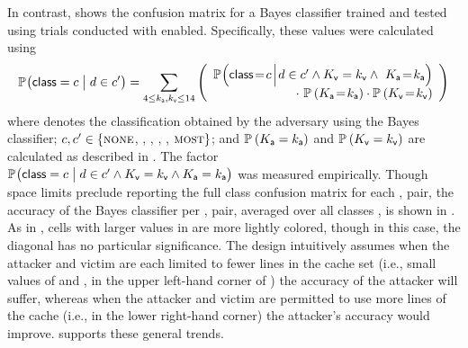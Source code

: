 In contrast,  shows the confusion matrix
for a \naive{} Bayes classifier trained and tested using \primeprobe
trials conducted with \cachebar enabled.  Specifically, these values
were calculated using
\begin{align*}
\cprob{\big}{}{\classifiedRV = \classId}{\victimDemand\in\classIdAlt} 
= \sum_{4 \le \attackerLineNmbr, \victimLineNmbr \le 14}
  \left(\begin{array}{r}
    \cprob{\Big}{}{\classifiedRV\!=\!\classId\!}{\!\victimDemand\in\classIdAlt \wedge \victimLineNmbrRV = \victimLineNmbr
  \wedge~\attackerLineNmbrRV\!=\!\attackerLineNmbr} \\
  \cdot~\prob{}{\attackerLineNmbrRV\!=\!\attackerLineNmbr}
  \cdot \prob{}{\victimLineNmbrRV\!=\!\victimLineNmbr}
  \end{array}\right)
\end{align*}
where \classifiedRV denotes the classification obtained by the
adversary using the \naive{} Bayes classifier; $c, c' \in
\{\textsc{none}$, \classOne, \classFew, \classSome, \classLots,
$\textsc{most}\}$; and $\mathbb{P}_{}\left({K_{\mathsf{a}} = k_{\mathsf{a}}}\right)$
and $\mathbb{P}_{}\left({K_{\mathsf{v}} = k_{\mathsf{v}}}\right)$ are calculated as
described in .  The factor\\
$\cprob{\big}{}{\classifiedRV=\classId}{\victimDemand\in\classIdAlt
  \wedge \victimLineNmbrRV = \victimLineNmbr \wedge
  \attackerLineNmbrRV = \attackerLineNmbr}$ was measured empirically.
Though space limits preclude reporting the full class confusion matrix
for each \victimLineNmbr, \attackerLineNmbr pair, the accuracy of the
\naive{} Bayes classifier per \victimLineNmbr, \attackerLineNmbr pair,
averaged over all classes \classId, is shown in .
As in , cells with larger values in
 are more lightly colored, though in this case,
the diagonal has no particular significance. The design intuitively
assumes when the attacker and victim are each limited to fewer lines
in the cache set (i.e., small values of \attackerLineNmbr and
\victimLineNmbr, in the upper left-hand corner of
) the accuracy of the attacker will suffer,
whereas when the attacker and victim are permitted to use more lines
of the cache (i.e., in the lower right-hand corner) the attacker's
accuracy would improve.   supports these general
trends.

